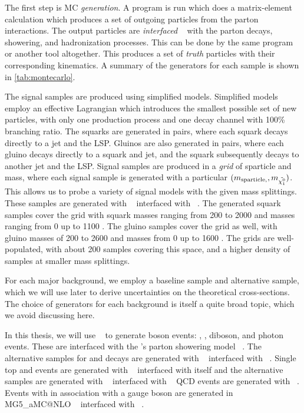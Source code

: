 The first step is MC \textit{generation}.
A program is run which does a matrix-element calculation which produces a set of outgoing particles from the parton interactions.
The output particles are \textit{interfaced} ~\cite{Mangano:2006rw} with the parton decays, showering, and hadronization processes.
This can be done by the same program or another tool altogether.
This produces a set of \textit{truth} particles with their corresponding kinematics.
A summary of the generators for each sample is shown in \cref{tab:montecarlo}.

The signal samples are produced using simplified models.
Simplified models employ an effective Lagrangian which introduces the smallest possible set of new particles, with only one production process and one decay channel with 100\% branching ratio.
The squarks are generated in pairs, where each squark decays directly to a jet and the LSP.
Gluinos are also generated in pairs, where each gluino decays directly to a squark and jet, and the squark subsequently decays to another jet and the LSP.
Signal samples are produced in a \textit{grid} of sparticle and \lsp mass, where each signal sample is generated with a particular $(m_{\text{sparticle}, }, m_{\tilde{\chi^0_1}})$.
This allows us to probe a variety of signal models with the given mass splittings.
These samples are generated with \madgraph ~\cite{madgraph1} interfaced with \PYTHIAEight ~\cite{Sjostrand:2014zea}.
The generated squark samples cover the grid with squark masses ranging from 200 \GeV to 2000 \GeV and \lsp masses ranging from 0 \GeV up to 1100 \GeV.
The gluino samples cover the grid as well, with gluino masses of 200 \GeV to 2600 \GeV and \lsp masses from 0 \GeV up to 1600 \GeV.
The grids are well-populated, with about 200 samples covering this space, and a higher density of samples at smaller mass splittings.


For each major background, we employ a baseline sample and alternative sample, which we will use later to derive uncertainties on the theoretical cross-sections.
The choice of generators for each background is itself a quite broad topic, which we avoid discussing here.

In this thesis, we will use \sherpa~\cite{Gleisberg:2008ta} to generate boson events: \Zll, \Wln, diboson, and photon events.
These are interfaced with the \sherpa's parton showering model ~\cite{sherpashower}.
The alternative samples for \Zll and \Wln decays are generated with \madgraph ~\cite{madgraph1} interfaced with \PYTHIAEight ~\cite{Sjostrand:2014zea}.
Single top and \ttbar events are generated with \powhegbox ~\cite{powheg-box} interfaced with itself and the alternative samples are generated with \mcatnlo ~\cite{Alwall:2014hca} interfaced with \HERWIGPP ~\cite{Frixione:2010ra}
QCD events are generated with \PYTHIAEight ~\cite{Sjostrand:2014zea}.
Events with \ttbar in association with a gauge boson are generated in MG5\_aMC@NLO ~\cite{Alwall:2014hca} interfaced with \PYTHIAEight ~\cite{Sjostrand:2014zea}.

